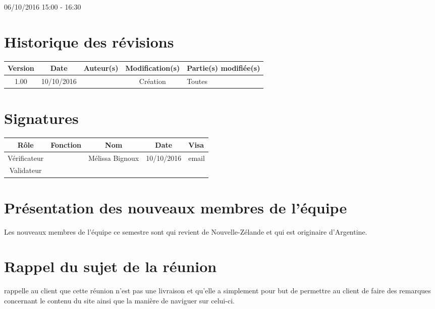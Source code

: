 \documentclass [a4paper] {article}
\begin{document}
06/10/2016			 				%
\hfill   
\hfill 	 15:00 - 16:30 				%


\section*{Historique des révisions}
\begin{center}
			\begin{tabular}{| c | c | c | c | p{4cm} |}
				\hline
				\rowcolor{Gray}
				Version & Date & Auteur(s) & Modification(s) & Partie(s) modifiée(s)		 \\
				\hline
				1.00 & 10/10/2016 & \Julie & Création & Toutes \\
		\hline		
			\end{tabular}
		\end{center}

\section*{Signatures}

		\begin{center}
			\begin{tabular}{| c | c | c | c | p{4cm} |}
				\hline
				\rowcolor{Gray}
				Rôle & Fonction & Nom & Date & Visa		 \\
				\hline
				Vérificateur & \RGC & Mélissa Bignoux & 10/10/2016 & email \\[30pt]
				\hline
				Validateur & & & & \\[30pt]	
				\hline
			\end{tabular}
		\end{center}


\section{Présentation des nouveaux membres de l'équipe}
Les nouveaux membres de l'équipe ce semestre sont \Francois{} qui revient de Nouvelle-Zélande et \Juliana{} qui est originaire d'Argentine.

\section{Rappel du sujet de la réunion}
\Pierre{} rappelle au client que cette réunion n'est pas une livraison et qu'elle a simplement pour but de permettre au client de faire des remarques concernant le contenu du site ainsi que la manière de naviguer sur celui-ci.
\end{document}
